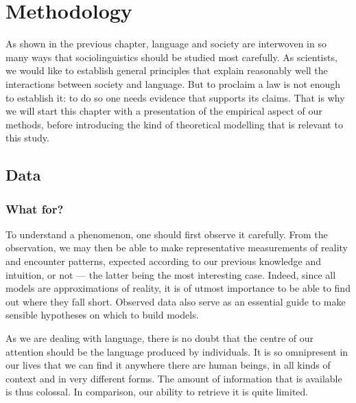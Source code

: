 \documentclass[../thesis.tex]{subfiles}
\begin{document}
\chapter{Methodology}
\label{ch:methods}

As shown in the previous chapter, language and society are interwoven in so many ways
that sociolinguistics should be studied most carefully. As scientists, we would like to
establish general principles that explain reasonably well the interactions between society and
language. But to proclaim a law is not enough to establish it: to do so one needs
evidence that supports its claims. That is why we will start this chapter with a
presentation of the empirical aspect of our methods, before introducing the kind of
theoretical modelling that is relevant to this study.



\section{Data}
\subsection{What for?}
To understand a phenomenon, one should first observe it carefully. From the observation,
we may then be able to make representative measurements of reality and encounter
patterns, expected according to our previous knowledge and intuition, or not --- the
latter being the most interesting case. Indeed, since all models are approximations of
reality, it is of utmost importance to be able to find out where they fall short.
Observed data also serve as an essential guide to make sensible hypotheses on which to
build models.

As we are dealing with language, there is no doubt that the centre of our attention
should be the language produced by individuals. It is so omnipresent in our lives that
we can find it anywhere there are human beings, in all kinds of context and in very
different forms. The amount of information that is available is thus colossal. In
comparison, our ability to retrieve it is quite limited.
\end{document}
